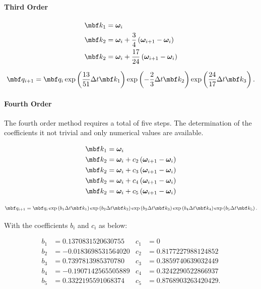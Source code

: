 \documentclass[10pt,a4paper]{article}
\newcommand{\mbs}[1]{{\boldsymbol{#1}}}
\numberwithin{equation}{section}
\begin{document}
\paragraph{Third Order}

\begin{align*}
\mbf k_1 & = \mbs \omega_i \\
\mbf k_2 & = \mbs \omega_i + \dfrac{3}{4} \left( \mbs \omega_{i+1} - \mbs \omega_i \right) \\
\mbf k_2 & = \mbs \omega_i + \dfrac{17}{24} \left( \mbs \omega_{i+1} - \mbs \omega_i \right)
\end{align*}

\begin{equation}
	\mbf q_{i+1} = \mbf q_i 
	\exp \left( \dfrac{13}{51} \Delta t \mbf k_1 \right)
	\exp \left( -\dfrac{2}{3} \Delta t \mbf k_2 \right)
	\exp \left( \dfrac{24}{17} \Delta t \mbf k_3 \right).
\end{equation}

\paragraph{Fourth Order}
The fourth order method requires a total of five steps. The determination of the coefficients it not trivial and only numerical values are available.

\begin{align*}
\mbf k_1 & = \mbs \omega_i \\
\mbf k_2 & = \mbs \omega_i + c_2 \left( \mbs \omega_{i+1} - \mbs \omega_i \right) \\
\mbf k_2 & = \mbs \omega_i + c_3 \left( \mbs \omega_{i+1} - \mbs \omega_i \right) \\
\mbf k_2 & = \mbs \omega_i + c_4 \left( \mbs \omega_{i+1} - \mbs \omega_i \right) \\
\mbf k_2 & = \mbs \omega_i + c_5 \left( \mbs \omega_{i+1} - \mbs \omega_i \right)
\end{align*}

\begin{equation}
	\mbf q_{i+1} = \mbf q_i 
	\exp \left(b_1 \Delta t \mbf k_1 \right)
	\exp \left(b_2 \Delta t \mbf k_2 \right)
	\exp \left(b_3 \Delta t \mbf k_3 \right)
	\exp \left(b_4 \Delta t \mbf k_4 \right)
	\exp \left(b_5 \Delta t \mbf k_5 \right).
\end{equation}

With the coefficients $b_i$ and $c_i$  as below:

\begin{align*}
b_1 &= 0.1370831520630755 & c_1 & = 0 \\
b_2 & = -0.0183698531564020 & c_2 & = 0.8177227988124852 \\
b_3 & =0.7397813985370780 & c_3 & = 0.3859740639032449 \\
b_4 & = -0.1907142565505889 & c_4 & = 0.3242290522866937 \\
b_5 & = 0.3322195591068374 & c_5 & = 0.8768903263420429.
\end{align*}
\end{document}
